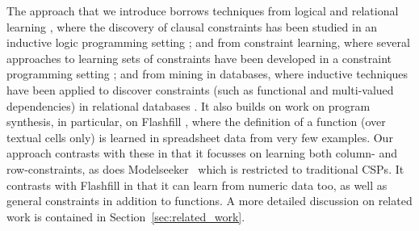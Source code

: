 \documentclass{IEEEtran}
\newcommand{\tias}[1]{\textcolor{blue}{{\sc Tias:} #1}\xspace}
\theoremstyle{definition}
\begin{document}
The approach that we introduce borrows techniques from logical and relational learning \cite{luc_book}, where
the discovery of clausal constraints has been studied in an inductive logic programming setting \cite{claudien,lallouet}; and from constraint learning,  where several approaches to learning sets of constraints have been developed in a constraint programming setting \cite{Quacq,Conacq,modelseeker};
and from mining in databases, where inductive techniques have been applied to discover constraints (such as functional and multi-valued dependencies) in relational databases \cite{savnik}.  It also builds on work on program synthesis, in particular, on Flashfill \cite{flashfill}, where the definition of a function (over textual cells only) is learned in spreadsheet data from
very few examples.  Our approach contrasts with these in that it focusses
on learning both column- and row-constraints, as does Modelseeker~\cite{modelseeker} which is restricted to traditional CSPs. It contrasts with Flashfill in that it can learn from numeric data too, as well as general constraints in addition to functions.
A more detailed discussion on related work is contained in Section~\ref{sec:related_work}.


\end{document}
